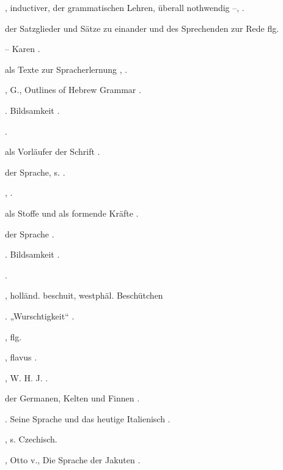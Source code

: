 \begin{register}

, inductiver, der grammatischen Lehren, überall nothwendig \pageref{sp.91}–\pageref{sp.92}, \pageref{sp.114}.

 der Satzglieder und Sätze zu einander und des Sprechenden zur Rede \pageref{sp.448} flg.

 – Karen \pageref{sp.201}.

 als Texte zur Spracherlernung \pageref{sp.51}, \pageref{sp.73}.

, G., Outlines of Hebrew Grammar \pageref{sp.113}.

. Bildsamkeit \pageref{sp.349}.

 \pageref{sp.36}.

 als Vorläufer der Schrift \pageref{sp.127}.


 der Sprache, s. .

 \pageref{sp.160}, \pageref{sp.307}. 

 als Stoffe und als formende Kräfte \pageref{sp.325}.

 der Sprache \pageref{sp.17}.

. Bildsamkeit \pageref{sp.349}.

 \pageref{sp.160}.

, holländ. beschuit, westphäl. Beschütchen 

. „Wurschtigkeit“ \pageref{sp.45}.

 \pageref{sp.103}, \pageref{sp.318} flg.

, flavus \pageref{sp.153}.

, W. H. J. \pageref{sp.281}\sed{, \pageref{sp.420}}.

 der Germanen, Kelten und Finnen \pageref{sp.293}.

. Seine Sprache und das heutige Italienisch \pageref{sp.139}.

, s. Czechisch.

, Otto v., Die Sprache der Jakuten \pageref{sp.52}.



\end{register}
